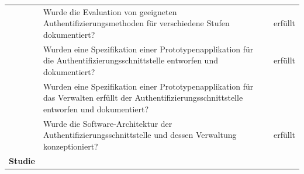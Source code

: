 \begin{longtable}[c]{@{}lll@{}}
\begin{minipage}[t]{0.14\columnwidth}
\strut\end{minipage} &
\begin{minipage}[t]{0.68\columnwidth}\raggedright\strut
Wurde die Evaluation von geeigneten Authentifizierungsmethoden für
verschiedene Stufen dokumentiert?
\strut\end{minipage} &
\begin{minipage}[t]{0.09\columnwidth}\raggedright\strut
erfüllt
\strut\end{minipage}\tabularnewline
\begin{minipage}[t]{0.14\columnwidth}\raggedright\strut
\strut\end{minipage} &
\begin{minipage}[t]{0.68\columnwidth}\raggedright\strut
Wurden eine Spezifikation einer Prototypenapplikation für die
Authentifizierungsschnittstelle entworfen und dokumentiert?
\strut\end{minipage} &
\begin{minipage}[t]{0.09\columnwidth}\raggedright\strut
erfüllt
\strut\end{minipage}\tabularnewline
\begin{minipage}[t]{0.14\columnwidth}\raggedright\strut
\strut\end{minipage} &
\begin{minipage}[t]{0.68\columnwidth}\raggedright\strut
Wurden eine Spezifikation einer Prototypenapplikation für das Verwalten
erfüllt der Authentifizierungsschnittstelle entworfen und dokumentiert?
\strut\end{minipage} &
\begin{minipage}[t]{0.09\columnwidth}\raggedright\strut
\strut\end{minipage}\tabularnewline
\begin{minipage}[t]{0.14\columnwidth}\raggedright\strut
\strut\end{minipage} &
\begin{minipage}[t]{0.68\columnwidth}\raggedright\strut
Wurde die Software-Architektur der Authentifizierungsschnittstelle und
dessen Verwaltung konzeptioniert?
\strut\end{minipage} &
\begin{minipage}[t]{0.09\columnwidth}\raggedright\strut
erfüllt
\strut\end{minipage}\tabularnewline
\begin{minipage}[t]{0.14\columnwidth}\raggedright\strut
\textbf{Studie}
\strut\end{minipage} &
\begin{minipage}[t]{0.68\columnwidth}\raggedright\strut

\end{minipage}
\end{longtable}
